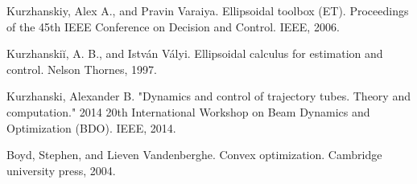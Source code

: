 \begin{thebibliography}{9}

Kurzhanskiy, Alex A., and Pravin Varaiya.
Ellipsoidal toolbox (ET).
Proceedings of the 45th IEEE Conference on Decision and Control. IEEE, 2006.

Kurzhanskiĭ, A. B., and István Vályi. Ellipsoidal calculus for estimation and control. Nelson Thornes, 1997.

Kurzhanski, Alexander B. "Dynamics and control of trajectory tubes. Theory and computation." 2014 20th International Workshop on Beam Dynamics and Optimization (BDO). IEEE, 2014.

Boyd, Stephen, and Lieven Vandenberghe. Convex optimization. Cambridge university press, 2004.

\end{thebibliography}